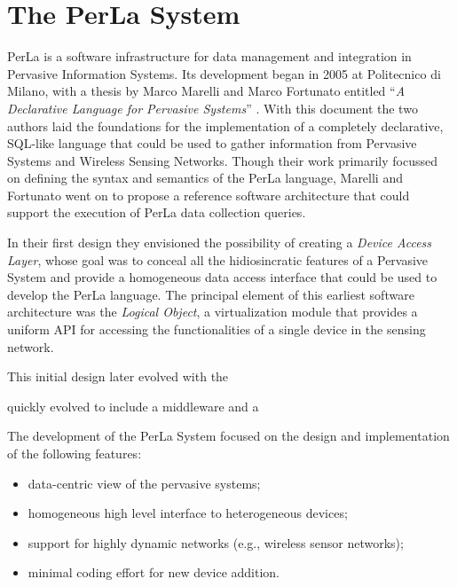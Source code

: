 \chapter{The PerLa System}

PerLa is a software infrastructure for data management and integration in
Pervasive Information Systems. Its development began in 2005 at Politecnico di
Milano, with a thesis by Marco Marelli and Marco Fortunato entitled ``\textit{A
Declarative Language for Pervasive Systems}'' \cite{mm_thesis}. With this
document the two authors laid the foundations for the implementation of a
completely declarative, SQL-like language that could be used to gather
information from Pervasive Systems and Wireless Sensing Networks. Though their
work primarily focussed on defining the syntax and semantics of the PerLa
language, Marelli and Fortunato went on to propose a reference software
architecture that could support the execution of PerLa data collection queries.

In their first design they envisioned the possibility of creating a
\textit{Device Access Layer}, whose goal was to conceal all the hidiosincratic
features of a Pervasive System and provide a homogeneous data access interface
that could be used to develop the PerLa language. The principal element of this
earliest software architecture was the \textit{Logical Object}, a
virtualization module that provides a uniform API for accessing the
functionalities of a single device in the sensing network.

This initial design later evolved with the 

quickly evolved to include a middleware and a 

The development of the PerLa System focused on the design and implementation of
the following features:

\begin{itemize}

    \item data-centric view of the pervasive systems;

    \item homogeneous high level interface to heterogeneous
    devices;

    \item support for highly dynamic networks (e.g., wireless
    sensor networks);

    \item minimal coding effort for new device addition.

\end{itemize}

